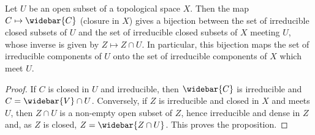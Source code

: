 \begin{proposition}\label{topo space open irre closed intersection}
Let $U$ be an open subset of a topological space $X$. Then the map $C\mapsto\widebar{C}$ (closure in $X$) gives a bijection between the set of irreducible closed subsets of $U$ and the set of irreducible closed subsets of $X$ meeting $U$, whose inverse is given by $Z\mapsto Z\cap U$. In particular, this bijection maps the set of irreducible components of $U$ onto the set of irreducible components of $X$ which meet $U$.
\end{proposition}
\begin{proof}
If $C$ is closed in $U$ and irreducible, then $\widebar{C}$ is irreducible and $C=\widebar{V}\cap U$. Conversely, if $Z$ is irreducible and closed in $X$ and meets $U$, then $Z\cap U$ is a non-empty open subset of $Z$, hence irreducible and dense in $Z$ and, as $Z$ is closed, $Z=\widebar{Z\cap U}$. This proves the proposition.
\end{proof}
